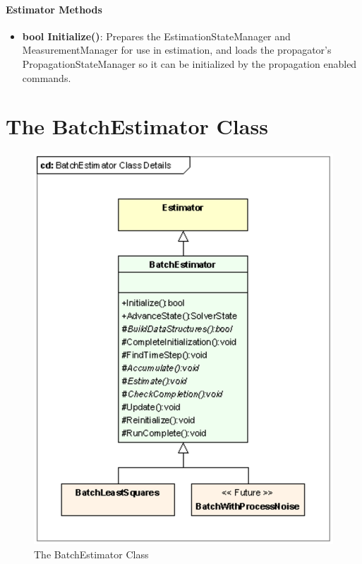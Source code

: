 \paragraph{Estimator Methods}

\begin{itemize}
\item \textbf{bool Initialize()}:  Prepares the EstimationStateManager and MeasurementManager for use in estimation, and loads the propagator's PropagationStateManager so it can be initialized by the propagation enabled commands.
\end{itemize}

\section{The BatchEstimator Class}

\begin{figure}[htbp]
\begin{center}
\includegraphics[scale=0.6]{Images/BatchEstimatorClassDetails.eps}
\caption{\label{fig:BatchEstimatorClassDetails}The BatchEstimator Class}
\end{center}
\end{figure}

